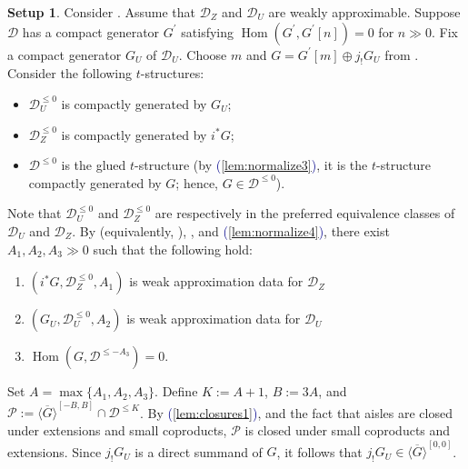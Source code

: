 \documentclass[11pt]{amsart}
\def\eqref#1{\textcolor{darkblue}{(\ref{#1})}}
\theoremstyle{plain}
\theoremstyle{definition}
\newtheorem{setup}[theorem]{Setup}
\numberwithin{equation}{section}
\numberwithin{theorem}{section}
\begin{document}
\begin{setup}
    \label{setup:standing}
    Consider .
    Assume that $\mathcal{D}_Z$ and $\mathcal{D}_U$ are weakly approximable.
    Suppose $\mathcal{D}$ has a compact generator $G^\prime$ satisfying $\operatorname{Hom}(G^\prime,G^\prime[n])=0$ for $n\gg 0$.
    Fix a compact generator $G_U$ of $\mathcal{D}_U$.
    Choose $m$ and $G = G^\prime[m]\oplus j_! G_U$ from .
    Consider the following $t$-structures:
    \begin{itemize}
        \item $\mathcal{D}_U^{\leq 0}$ is compactly generated by $G_U$;
        \item $\mathcal{D}_Z^{\leq 0}$ is compactly generated by $i^\ast G$;
        \item $\mathcal{D}^{\leq 0}$ is the glued $t$-structure (by \eqref{lem:normalize3}, it is the $t$-structure compactly generated by $G$; hence, $G\in \mathcal{D}^{\leq 0}$).
    \end{itemize}
    Note that $\mathcal{D}_U^{\leq 0}$ and $\mathcal{D}_Z^{\leq 0}$ are respectively in the preferred equivalence classes of $\mathcal{D}_U$ and $\mathcal{D}_Z$. 
    By \cite[Lemma 3.7]{Burke/Neeman/Pauwels:2023} (equivalently, \cite[Proposition 3.6]{Neeman:2026}), , and \eqref{lem:normalize4}, there exist $A_1,A_2,A_3 \gg 0$ such that the following hold:
    \begin{enumerate}
        \item \label{setup:standinga1} $(i^\ast G,\mathcal{D}_Z^{\leq 0},A_1)$ is weak approximation data for $\mathcal{D}_Z$
        \item \label{setup:standinga2} $(G_U,\mathcal{D}_U^{\leq 0},A_2)$ is weak approximation data for $\mathcal{D}_U$
        \item \label{setup:standinga3} $\operatorname{Hom}(G,\mathcal{D}^{\leq -A_3})=0$.
    \end{enumerate}
    Set $A= \max\{A_1,A_2,A_3\}$. 
    Define $K := A+1$, $B := 3A$, and $\mathcal{P} := \overline{\langle G\rangle}^{[-B,B]} \cap \mathcal{D}^{\leq K}$.
    By \eqref{lem:closures1}, and the fact that aisles are closed under extensions and small coproducts, $\mathcal{P}$ is closed under small coproducts and extensions.
    Since $j_! G_U$ is a direct summand of $G$, it follows that $j_! G_U\in \overline{\langle G\rangle}^{[0,0]}$.
\end{setup}
\end{document}
